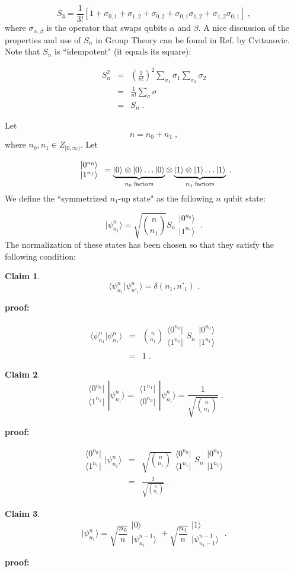 \documentclass[12pt]{article}%
\newtheorem{claim}{Claim}
\newcommand{\proof}[0]{{\bf proof:} }
\newcommand{\qed}[0]{\newline\noindent{\bf QED }}
\newcommand{\bra}[1]{\langle#1|}
\newcommand{\ket}[1]{|#1\rangle}
\newcommand{\av}[1]{\langle#1\rangle}
\newcommand{\beq}{\begin{equation}}
\newcommand{\eeq}{\end{equation}}
\newcommand{\beqa}{\begin{eqnarray}}
\newcommand{\eeqa}{\end{eqnarray}}
\newcommand{\alp}[0]{{\alpha}}
\newcommand{\brazo}{ \begin{array}{r}
 \bra{0^{n_0}}
 \\
 \bra{1^{n_1}}
 \end{array}
 }
\newcommand{\ketzo}{ \begin{array}{l}
 \ket{0^{n_0}}
 \\
 \ket{1^{n_1}}
 \end{array}
 }
\begin{document}
{\beq
S_3 = \frac{1}{3!}[
1 + \sigma_{0,1}
+ \sigma_{1,2}
+ \sigma_{0,2}
+ \sigma_{0,1}\sigma_{1,2}
+ \sigma_{1,2}\sigma_{0,1}
]
\;,
\eeq
where $\sigma_{\alp, \beta}$ is the operator
that swaps qubits $\alp$ and $\beta$.
A nice discussion of the properties and use of $S_n$
in Group Theory can be
found in Ref.\cite{cvit} by Cvitanovic.
Note that $S_n$ is ``idempotent" (it equals its square):


\beqa
S_n^2 &=& \left(\frac{1}{n!}\right)^2 \sum_{\sigma_1}\sigma_1
\sum_{\sigma_2}\sigma_2
\\
 &=&\frac{1}{n!} \sum_{\sigma}\sigma
 \\
 &=& S_n
 \;.
 \eeqa


Let
 \beq
 n = n_0 + n_1
 \;,
 \eeq
 where $n_0, n_1\in Z_{[0, \infty)}$.
Let

 \beq
 \ketzo = \underbrace{
 \ket{0}\otimes\ket{0}\ldots\ket{0}}
 _{n_0\; {\rm factors}}
 \otimes
 \underbrace{
 \ket{1}\otimes\ket{1}\ldots\ket{1}}
 _{n_1\; {\rm factors}}
 \;.
 \eeq
 We define  the ``symmetrized
 $n_1$-up state" as the following $n$ qubit state:



 \beq
 \ket{\psi^{n}_{n_1}} =
 \sqrt{n\choose n_1}S_n
\ketzo
 \;.
 \eeq
 The normalization of these states has
 been chosen so that they satisfy
 the following condition:

 \begin{claim}
 \beq
 \av{\psi^{n}_{n_1} | \psi^{n}_{n'_1}}
 = \delta(n_1, n'_1)
 \;.
 \eeq
 \end{claim}
 \proof


 \beqa
 \av{\psi^{n}_{n_1} | \psi^{n}_{n_1}}
 &=&
{n\choose n_1}
\brazo
S_n
\ketzo
 \\
 &=& 1
 \;.
 \eeqa
 \qed


 \begin{claim}
 \beq
 \brazo \ket{\psi^n_{n_1}}=
 \begin{array}{c}
  \bra{1^{n_1}}
 \\
 \bra{0^{n_0}}
 \end{array}
 \ket{\psi^n_{n_1}} =
 \frac{1}{\sqrt{n\choose n_1}}
 \;.
 \eeq
 \end{claim}
 \proof

 \beqa
 \brazo \ket{\psi^n_{n_1}} &=&
 \sqrt{n\choose n_1}
 \brazo S_n \ketzo
 \\
 &=&
  \frac{1}{\sqrt{n\choose n_1}}
 \;.
 \eeqa
 \qed

 \begin{claim}

 \beq
 \ket{\psi^n_{n_1}}=
 \sqrt{\frac{n_0}{n}}
 \begin{array}{l}
 \ket{0}
 \\
 \ket{\psi^{n-1}_{n_1}}
 \end{array}
 +
 \sqrt{\frac{n_1}{n}}
 \begin{array}{l}
 \ket{1}
 \\
 \ket{\psi^{n-1}_{n_1-1}}
 \end{array}
 \;.
 \label{eq-top-qubit-resolved}
 \eeq
 \end{claim}
 \proof

}
\end{document}
